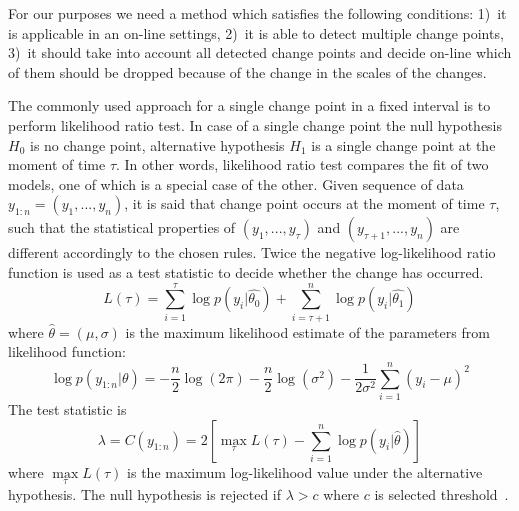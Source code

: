 For our purposes we need a method which satisfies the following
conditions: 1)~it is applicable in an on-line settings, 2)~it is able to
detect multiple change points, 3)~it should take into account all
detected change points and decide on-line which of them should be
dropped because of the change in the scales of the changes.

The commonly used approach for a single change point in a fixed interval is to perform likelihood ratio test.
%
In case of a single change point the null hypothesis $H_{0}$ is no
change point, alternative hypothesis $H_{1}$ is a single change point
at the moment of time $\tau$.
%
In other words, likelihood ratio test compares the fit of two
models, one of which is a special case of the other.
%
Given sequence of data $y_{1:n}=(y_{1},...,y_{n})$, it is said that
change point occurs at the moment of time $\tau$, such that the
statistical properties of $(y_{1},...,y_{\tau})$ and
$(y_{\tau+1},...,y_{n})$ are different accordingly to the chosen rules.
%
Twice the negative log-likelihood ratio function is used as a test
statistic to decide whether the change has occurred.
\begin{equation}
L(\tau)= \sum_{i=1}^{\tau}  \log p( y_{i}|\hat{\theta_{0}} ) + \sum_{i=\tau+1}^{n} \log p(y_{i}| \hat{\theta_{1}})
\end{equation}
\noindent
where $\hat{\theta}=(\mu, \sigma)$ is the maximum likelihood estimate of the parameters from likelihood function:
\[
\log p (y_{1:n}|\theta) =  -\frac{n}{2} \log(2 \pi) - \frac{n}{2} \log(\sigma^2) - \frac{1}{2\sigma^2} \sum_{i=1}^{n}(y_{i}-\mu)^2
\]
The test statistic is
\begin{equation}
\label{eq:gamma}
\lambda=C(y_{1:n}) = 2[\displaystyle \max_{\tau} L(\tau) - \sum_{i=1}^{n} \log p(y_{i}|\hat{\theta})]
\end{equation}
\noindent
%
where $\max\limits_{\tau} L(\tau)$ is the maximum log-likelihood
value under the alternative hypothesis.  The null hypothesis is
rejected if $\lambda > c$ where $c$ is selected threshold~\cite{KillickRpackage}.

